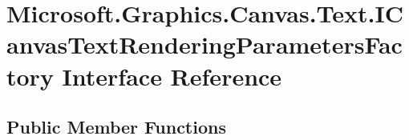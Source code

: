 \hypertarget{interface_microsoft_1_1_graphics_1_1_canvas_1_1_text_1_1_i_canvas_text_rendering_parameters_factory}{}\section{Microsoft.\+Graphics.\+Canvas.\+Text.\+I\+Canvas\+Text\+Rendering\+Parameters\+Factory Interface Reference}
\label{interface_microsoft_1_1_graphics_1_1_canvas_1_1_text_1_1_i_canvas_text_rendering_parameters_factory}
\subsection*{Public Member Functions}
